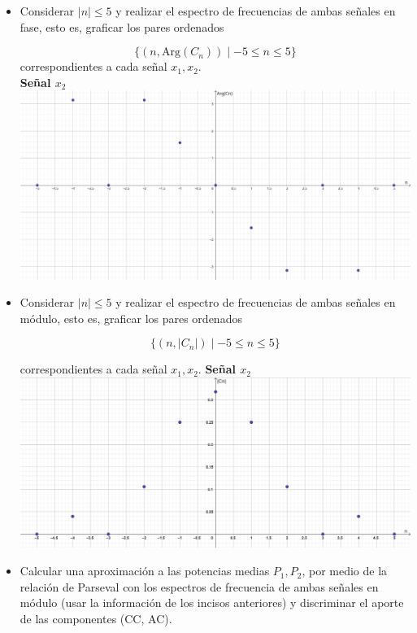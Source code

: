 \documentclass[12pt,a4paper]{report}
\begin{document}
\begin{enumerate}[label=\alph*),left=0pt]
\begin{itemize}[left=0pt]
    \item Considerar $|n| \leq 5$ y realizar el espectro de frecuencias de ambas señales en fase, esto es, graficar los 
      pares ordenados

      $$\{(n, \text{Arg}(C_n)) \mid -5 \leq n \leq 5\}$$
      correspondientes a cada señal $x_1, x_2$.\\

	\textbf{Señal $x_2$}\\

      \includegraphics[width=1\textwidth]{images/ej2.4.png}	

      \item Considerar $|n| \leq 5$ y realizar el espectro de frecuencias de ambas señales en módulo, esto es, graficar 
        los pares ordenados

      $$\{(n, |C_n|) \mid -5 \leq n \leq 5\}$$

      correspondientes a cada señal $x_1, x_2$.\newline
      \textbf{Señal $x_2$}\\
      \includegraphics[width=1\textwidth]{images/ej2.6.png}	\\



    \item Calcular una aproximación a las potencias medias $P_1, P_2$, por medio de la relación de Parseval con los 
      espectros de frecuencia de ambas señales en módulo (usar la información de los incisos anteriores) y discriminar 
      el aporte de las componentes (CC, AC).


\end{itemize}
\end{enumerate}
\end{document}
